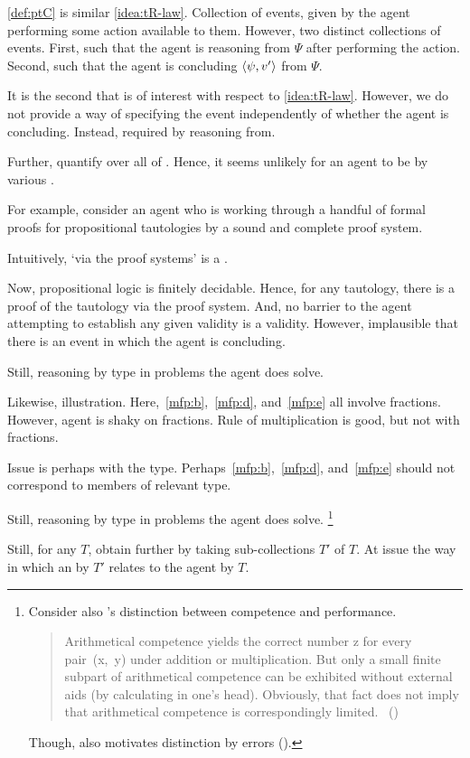 \begin{note}
  \noindent%
  \autoref{def:ptC} is similar \autoref{idea:tR-law}.
  Collection of events, given by the agent performing some action available to them.
  However, two distinct collections of events.
  First, such that the agent is reasoning from \(\Psi\) after performing the action.
  Second, such that the agent is concluding \(\langle \psi, v' \rangle\) from \(\Psi\).

  It is the second that is of interest with respect to \autoref{idea:tR-law}.
  However, we do not provide a way of specifying the event independently of whether the agent is concluding.
  Instead, required by reasoning from.
\end{note}

\begin{note}
  Further, quantify over all  of \torN{}.
  Hence, it seems unlikely for an agent to be  by various .

  For example, consider an agent who is working through a handful of formal proofs for propositional tautologies by a sound and complete proof system.

  Intuitively, `via the proof systems' is a \torN{}.

  Now, propositional logic is finitely decidable.
  Hence, for any tautology, there is a proof of the tautology via the proof system.
  And, no barrier to the agent attempting to establish any given validity is a validity.
  However, implausible that there is an event in which the agent is concluding.

  Still, reasoning by type in problems the agent does solve.

  Likewise, illustration.
  Here,~\ref{mfp:b},~\ref{mfp:d}, and~\ref{mfp:e} all involve fractions.
  However, agent is shaky on fractions.
  Rule of multiplication is good, but not with fractions.

  Issue is perhaps with the type.
  Perhaps~\ref{mfp:b},~\ref{mfp:d}, and~\ref{mfp:e} should not correspond to members of relevant type.

  Still, reasoning by type in problems the agent does solve.%
  \footnote{
    Consider also \citeauthor{Chomsky:2015aa}'s distinction between competence and performance.

    \begin{quote}
    Arithmetical competence yields the correct number z for every pair~(x,~y) under addition or multiplication.
    But only a small finite subpart of arithmetical competence can be exhibited without external aids (by calculating in one's head).
    Obviously, that fact does not imply that arithmetical competence is correspondingly limited.%
    \mbox{ }\hfill\mbox{(\citeyear[xii]{Chomsky:2015aa})}
  \end{quote}

  Though, \citeauthor{Chomsky:2015aa} also motivates distinction by errors (\citeyear[2]{Chomsky:2015aa}).
  }

  Still, for any \torN{} \(T\), obtain further  by taking sub-collections \(T'\) of \(T\).
  At issue the way in which an  by \(T'\) relates to the agent \tCV{} by \(T\).
\end{note}

